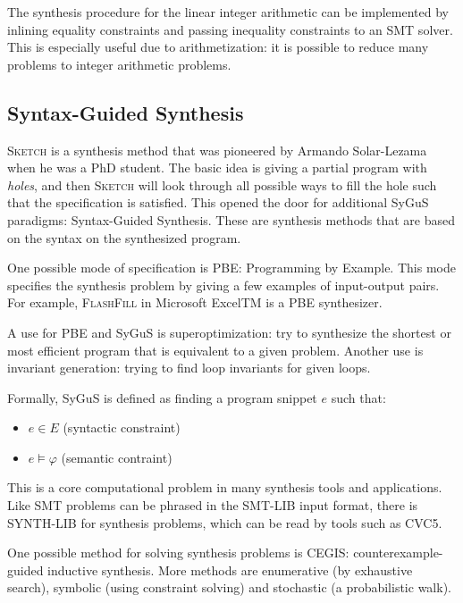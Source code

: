 The synthesis procedure for the linear integer arithmetic can be implemented by
inlining equality constraints and passing inequality constraints to an SMT solver.
This is especially useful due to arithmetization: it is possible to reduce
many problems to integer arithmetic problems.

\subsection{Syntax-Guided Synthesis}

\textsc{Sketch} is a synthesis method that was pioneered by Armando Solar-Lezama when he was a PhD student.
The basic idea is giving a partial program with \emph{holes}, and then \textsc{Sketch} will look through all
possible ways to fill the hole such that the specification is satisfied.
This opened the door for additional SyGuS paradigms: Syntax-Guided Synthesis. These are
synthesis methods that are based on the syntax on the synthesized program.

One possible mode of specification is PBE: Programming by Example. This mode specifies the synthesis problem by giving a few
examples of input-output pairs. For example, \textsc{FlashFill} in Microsoft Excel\textsc{TM} is a PBE synthesizer.

A use for PBE and SyGuS is superoptimization: try to synthesize the shortest or most efficient program that
is equivalent to a given problem. Another use is invariant generation: trying to find loop invariants
for given loops.

Formally, SyGuS is defined as finding a program snippet $e$ such that:
\begin{itemize}
\item $e\in E$ (syntactic constraint)
\item $e \models \varphi$ (semantic contraint)
\end{itemize}
This is a core computational problem in many synthesis tools and applications.
Like SMT problems can be phrased in the SMT-LIB input format, there is SYNTH-LIB
for synthesis problems, which can be read by tools such as CVC5.

One possible method for solving synthesis problems is CEGIS: counterexample-guided inductive synthesis.
More methods are enumerative (by exhaustive search), symbolic (using constraint solving) and
stochastic (a probabilistic walk).